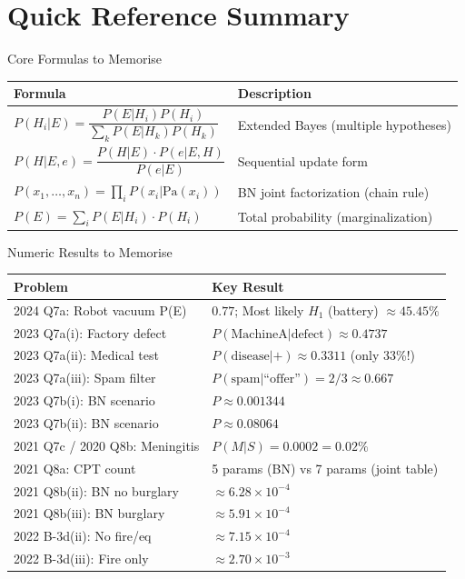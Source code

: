 \documentclass[12pt,a4paper]{article}
\begin{document}
\newpage
\section*{Quick Reference Summary}

\begin{keybox}{Core Formulas to Memorise}
\begin{tabular}{ll}
\toprule
\textbf{Formula} & \textbf{Description}\\
\midrule
$P(H_i|E) = \dfrac{P(E|H_i)P(H_i)}{\sum_k P(E|H_k)P(H_k)}$ & Extended Bayes (multiple hypotheses)\\[8pt]
$P(H|E,e) = \dfrac{P(H|E)\cdot P(e|E,H)}{P(e|E)}$ & Sequential update form\\[8pt]
$P(x_1,\ldots,x_n) = \prod_i P(x_i|\text{Pa}(x_i))$ & BN joint factorization (chain rule)\\[4pt]
$P(E) = \sum_i P(E|H_i)\cdot P(H_i)$ & Total probability (marginalization)\\
\bottomrule
\end{tabular}
\end{keybox}

\begin{keybox}{Numeric Results to Memorise}
\begin{tabular}{ll}
\toprule
\textbf{Problem} & \textbf{Key Result}\\
\midrule
2024 Q7a: Robot vacuum P(E) & $0.77$; Most likely $H_1$ (battery) $\approx 45.45\%$\\
2023 Q7a(i): Factory defect & $P(\text{MachineA}|\text{defect}) \approx 0.4737$\\
2023 Q7a(ii): Medical test & $P(\text{disease}|+) \approx 0.3311$ (only 33\%!)\\
2023 Q7a(iii): Spam filter & $P(\text{spam}|\text{``offer''}) = 2/3 \approx 0.667$\\
2023 Q7b(i): BN scenario & $P \approx 0.001344$\\
2023 Q7b(ii): BN scenario & $P \approx 0.08064$\\
2021 Q7c / 2020 Q8b: Meningitis & $P(M|S) = 0.0002 = 0.02\%$\\
2021 Q8a: CPT count & 5 params (BN) vs 7 params (joint table)\\
2021 Q8b(ii): BN no burglary & $\approx 6.28 \times 10^{-4}$\\
2021 Q8b(iii): BN burglary & $\approx 5.91 \times 10^{-4}$\\
2022 B-3d(ii): No fire/eq & $\approx 7.15 \times 10^{-4}$\\
2022 B-3d(iii): Fire only & $\approx 2.70 \times 10^{-3}$\\
\bottomrule
\end{tabular}
\end{keybox}
\end{document}

